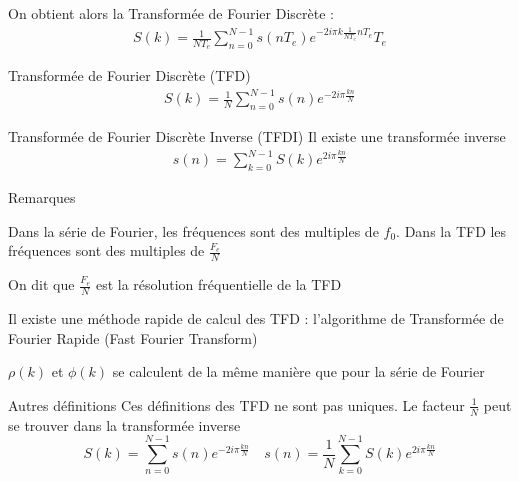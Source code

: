 \documentclass{beamer}
\begin{document}
\begin{frame}
On obtient alors la Transformée de Fourier Discrète :
\begin{align*}
S(k) = \frac{1}{NT_e}\sum_{n=0}^{N-1}s(nT_e)e^{-2i\pi k \frac{1}{NT_e} nT_e}T_e
\end{align*}
\begin{block}{Transformée de Fourier Discrète (TFD)}
\begin{align*}
S(k) = \frac{1}{N}\sum_{n=0}^{N-1}s(n)e^{-2i\pi \frac{kn}{N}}
\end{align*}
\end{block}
\pause
\begin{block}{Transformée de Fourier Discrète Inverse (TFDI)}
Il existe une transformée inverse
\begin{align*}
s(n) = \sum_{k=0}^{N-1}S(k)e^{2i\pi \frac{kn}{N}}
\end{align*}
\end{block}

\end{frame}

\begin{frame}
\begin{alertblock}{Remarques}
\itemize\justifying
\item Dans la série de Fourier, les fréquences sont des multiples de $f_0$. Dans
la TFD les fréquences sont des multiples de $\frac{F_e}{N}$
\item On dit que $\frac{F_e}{N}$ est la résolution fréquentielle de la TFD
\item Il existe une méthode rapide de calcul des TFD : l'algorithme de
Transformée de Fourier Rapide (Fast Fourier Transform)
\item $\rho(k)$ et $\phi(k)$ se calculent de la même manière que pour la série
de Fourier
\end{alertblock}
\pause
\begin{block}{Autres définitions}
Ces définitions des TFD ne sont pas uniques. Le facteur $\frac{1}{N}$ peut se
trouver dans la transformée inverse
\[
S(k) = \sum_{n=0}^{N-1}s(n)e^{-2i\pi \frac{kn}{N}} \quad s(n) =
\frac{1}{N}\sum_{k=0}^{N-1}S(k)e^{2i\pi \frac{kn}{N}}
\]
\end{block}
\end{frame}
\end{document}
